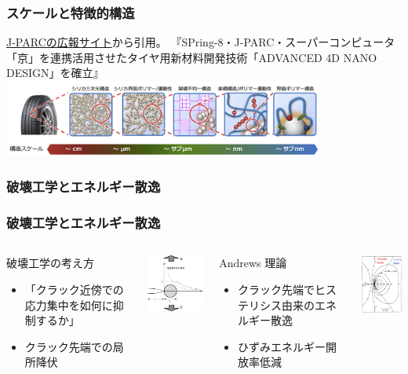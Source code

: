 \documentclass[11pt, dvipdfmx]{beamer}
\begin{document}
\begin{frame}
\frametitle{スケールと特徴的構造}
\href{http://j-parc.jp/ja/topics/2015/Pulse151112.html}{J-PARCの広報サイト}から引用。
\small
『SPring-8・J-PARC・スーパーコンピュータ「京」を連携活用させたタイヤ用新材料開発技術「ADVANCED 4D NANO DESIGN」を確立』
\centering
\includegraphics[width=105mm]{./fig/press151112_03.jpg}
\end{frame}
\subsubsection{破壊工学とエネルギー散逸}
\begin{frame}
\frametitle{破壊工学とエネルギー散逸}
\begin{columns}[totalwidth=1\textwidth]
\vspace{-2mm}
\begin{exampleblock}{破壊工学の考え方}
\small
\begin{itemize}
\item
「クラック近傍での応力集中を如何に抑制するか」
\item 
クラック先端での\alert{局所降伏}
\end{itemize}
\end{exampleblock}
\centering
	\includegraphics[width=40mm]{./fig/Crack_Yield.pdf}
\begin{alertblock}{Andrews 理論}
\small
	\begin{itemize}
	\item
	クラック先端で\alert{ヒステリシス由来のエネルギー散逸}
	\item
	ひずみエネルギー開放率低減
	\end{itemize}
\end{alertblock}
\centering
\includegraphics[width=30mm]{./fig/crack.png}	
\end{columns}
\end{frame}
\end{document}

